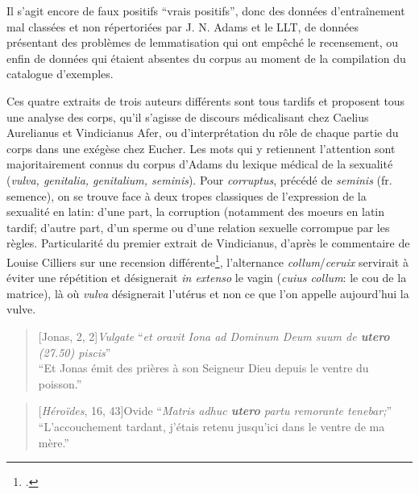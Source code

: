 Il s'agit encore de faux positifs ``vrais positifs'', donc des données d'entraînement mal classées et non répertoriées par J. N. Adams et le LLT, de données présentant des problèmes de lemmatisation qui ont empêché le recensement, ou enfin de données qui étaient absentes du corpus au moment de la compilation du catalogue d'exemples.

Ces quatre extraits de trois auteurs différents sont tous tardifs et proposent tous une analyse des corps, qu'il s'agisse de discours médicalisant chez Caelius Aurelianus et Vindicianus Afer, ou d'interprétation du rôle de chaque partie du corps dans une exégèse chez Eucher. Les mots qui y retiennent l'attention sont majoritairement connus du corpus d'Adams du lexique médical de la sexualité (\textit{vulva, genitalia, genitalium, seminis}). Pour \textit{corruptus}, précédé de \textit{seminis} (fr. semence), on se trouve face à deux tropes classiques de l'expression de la sexualité en latin: d'une part, la corruption (notamment des moeurs en latin tardif; d'autre part, d'un sperme ou d'une relation sexuelle corrompue par les règles. Particularité du premier extrait de Vindicianus, d'après le commentaire de Louise Cilliers sur une recension différente\footcite[p.236]{cilliers_vindicianuss_2005}, l'alternance \textit{collum}/\textit{ceruix} servirait à éviter une répétition et désignerait \textit{in extenso} le vagin (\textit{cuius collum}: le cou de la matrice), là où \textit{vulva} désignerait l'utérus et non ce que l'on appelle aujourd'hui la vulve.

\starbreak

\begin{quote}[Jonas, 2, 2]{\textit{Vulgate}}
    \enquote{\textit{et oravit Iona ad Dominum Deum suum de \textbf{utero} (27.50) piscis}} \\
    \enquote{Et Jonas émit des prières à son Seigneur Dieu depuis le ventre du poisson.}
\end{quote}

\begin{quote}[\textit{Héroïdes}, 16, 43]{Ovide}
    \enquote{\textit{Matris adhuc \textbf{utero} partu remorante tenebar;}} \\
    \enquote{L'accouchement tardant, j'étais retenu jusqu'ici dans le ventre de ma mère.}
\end{quote} 

\starbreak

